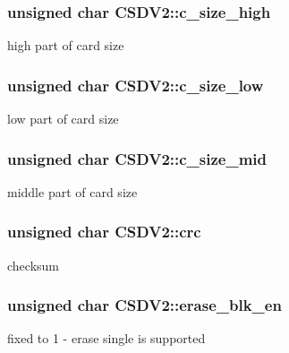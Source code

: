 \subsubsection[{\texorpdfstring{c\+\_\+size\+\_\+high}{c_size_high}}]{\setlength{\rightskip}{0pt plus 5cm}unsigned char C\+S\+D\+V2\+::c\+\_\+size\+\_\+high}\hypertarget{struct_c_s_d_v2_a18b212514052366ee8cc2f28bd945f83}{}\label{struct_c_s_d_v2_a18b212514052366ee8cc2f28bd945f83}
high part of card size 
\subsubsection[{\texorpdfstring{c\+\_\+size\+\_\+low}{c_size_low}}]{\setlength{\rightskip}{0pt plus 5cm}unsigned char C\+S\+D\+V2\+::c\+\_\+size\+\_\+low}\hypertarget{struct_c_s_d_v2_a51f11aace6d410815922936272328ca9}{}\label{struct_c_s_d_v2_a51f11aace6d410815922936272328ca9}
low part of card size 
\subsubsection[{\texorpdfstring{c\+\_\+size\+\_\+mid}{c_size_mid}}]{\setlength{\rightskip}{0pt plus 5cm}unsigned char C\+S\+D\+V2\+::c\+\_\+size\+\_\+mid}\hypertarget{struct_c_s_d_v2_a18a7efb31f3db1178cb5fb5be7111a43}{}\label{struct_c_s_d_v2_a18a7efb31f3db1178cb5fb5be7111a43}
middle part of card size 
\subsubsection[{\texorpdfstring{crc}{crc}}]{\setlength{\rightskip}{0pt plus 5cm}unsigned char C\+S\+D\+V2\+::crc}\hypertarget{struct_c_s_d_v2_ac5b251d008704ff292ea77b55e4bc97d}{}\label{struct_c_s_d_v2_ac5b251d008704ff292ea77b55e4bc97d}
checksum 
\subsubsection[{\texorpdfstring{erase\+\_\+blk\+\_\+en}{erase_blk_en}}]{\setlength{\rightskip}{0pt plus 5cm}unsigned char C\+S\+D\+V2\+::erase\+\_\+blk\+\_\+en}\hypertarget{struct_c_s_d_v2_a968e8021601578943a05e7a0397a2040}{}\label{struct_c_s_d_v2_a968e8021601578943a05e7a0397a2040}
fixed to 1 -\/ erase single is supported 
